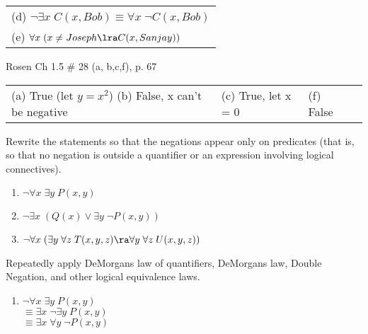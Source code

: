 \begin{questions}
\begin{solution}
      \begin{tabular}{l}
        (d) $\neg \exists x\; C(x,Bob) \equiv \forall x\; \neg C(x,Bob)$ \\
        (e) $\forall x\; (x \neq Joseph \lra C(x, Sanjay))$
      \end{tabular}
  \end{solution}


 Rosen Ch 1.5 \# 28 (a, b,c,f), p. 67
    \ifprintanswers
        \vspace{-12pt}
    \fi
  \begin{solution}
      \begin{tabular}{llll}
        (a) True (let $y=x^2$) (b) False, x can't be negative & (c) True, let x = 0 & (f) False 
      \end{tabular}
  \end{solution}


 Rewrite the statements so that the negations appear only on predicates (that is, so that no negation is outside a quantifier or an expression involving logical connectives).
  \begin{enumerate}[label=(\alph*),itemsep=0pt,parsep=0pt,
      topsep=0pt,partopsep=0pt]
      \item $\neg \forall x\; \exists y\; P(x,y)$
      \item $\neg \exists x\; (Q(x) \vee \exists y\; \neg P(x,y))$
      \item $\neg \forall x\; (\exists y\; \forall z\; T(x,y,z) \ra \forall y\; \forall z\; U(x,y,z))$
    \end{enumerate}
    \ifprintanswers
        \vspace{-12pt}
    \fi
  \begin{solution} Repeatedly apply DeMorgans law of quantifiers, DeMorgans law, Double Negation, and other logical equivalence laws.
    \begin{enumerate}[label=(\alph*),itemsep=0pt,parsep=0pt,
        topsep=0pt,partopsep=0pt]
        \item $\neg \forall x\; \exists y\; P(x,y)$ \\
          $ \equiv \exists x\; \neg \exists y\; P(x,y)$ \\
          $ \equiv \exists x\; \forall y\; \neg P(x,y)$ 
          

\end{enumerate}
\end{solution}
\end{questions}
